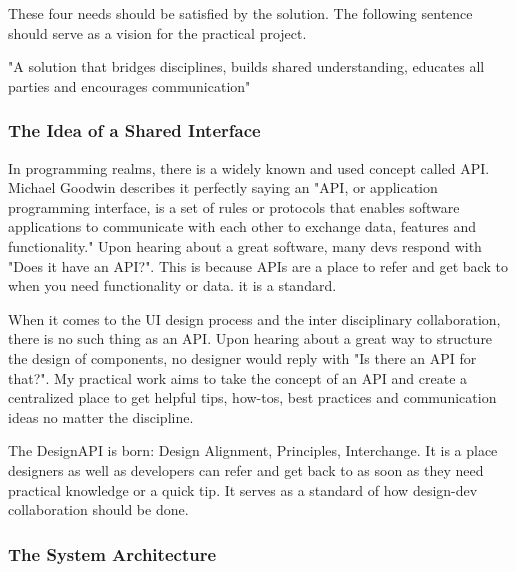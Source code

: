 These four needs should be satisfied by the solution. The following sentence should serve as a
vision for the practical project.

"A solution that bridges disciplines, builds shared understanding, educates all parties and
encourages communication"

\subsubsection{The Idea of a Shared Interface}


In programming realms, there is a widely known and used concept called API. Michael Goodwin
describes it perfectly saying an "API, or application programming interface, is a set of rules or
protocols that enables software applications to communicate with each other to exchange data,
features and functionality."  Upon hearing about a
great software, many devs respond with "Does it have an API?". This is because APIs are a place to
refer and get back to when you need functionality or data. it is a standard.

When it comes to the UI design process and the inter disciplinary collaboration, there is no such
thing as an API. Upon hearing about a great way to structure the design of components, no designer
would reply with "Is there an API for that?". My practical work aims to take the concept of an API
and create a centralized place to get helpful tips, how-tos, best practices and communication ideas
no matter the discipline.

The DesignAPI is born: Design Alignment, Principles, Interchange. It is a place designers as well as
developers can refer and get back to as soon as they need practical knowledge or a quick tip. It
serves as a standard of how design-dev collaboration should be done.

\subsubsection{The System Architecture}
% 

